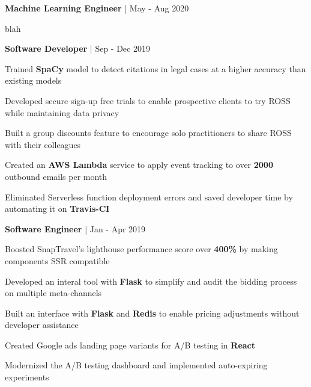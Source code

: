 


\begin{cventries}


\cventry
{\textbf{Machine Learning Engineer} | \color{awesome}{PerkinElmer}}
{May - Aug 2020} %
{ %
\begin{cvitems}
\item {blah}
\end{cvitems}
}


\cventry
{\textbf{Software Developer} | \color{awesome}{ROSS Intelligence}}
{Sep - Dec 2019} %
{ %
\begin{cvitems}
\item {Trained \textbf{SpaCy} model to detect citations in legal cases at a higher accuracy than existing models}
\item {Developed secure sign-up free trials to enable prospective clients to try ROSS while maintaining data privacy}
\item {Built a group discounts feature to encourage solo practitioners to share ROSS with their colleagues}
\item {Created an \textbf{AWS Lambda} service to apply event tracking to over \textbf{2000} outbound emails per month}
\item {Eliminated Serverless function deployment errors and saved developer time by automating it on \textbf{Travis-CI}}
\end{cvitems}
}


\cventry
{\textbf{Software Engineer} | \color{awesome}{SnapTravel}}
{Jan - Apr 2019} %
{ %
\begin{cvitems}
\item {Boosted SnapTravel's lighthouse performance score over \textbf{400\%} by making components SSR compatible}
\item {Developed an interal tool with \textbf{Flask} to simplify and audit the bidding process on multiple meta-channels}
\item {Built an interface with \textbf{Flask} and \textbf{Redis} to enable pricing adjustments without developer assistance}
\item {Created Google ads landing page variants for A/B testing in \textbf{React}}
\item {Modernized the A/B testing dashboard and implemented auto-expiring experiments}
\end{cvitems}
}


\end{cventries}
